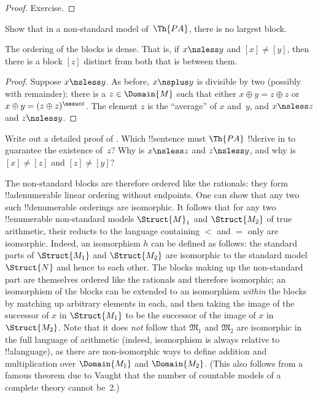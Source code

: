 \documentclass[../../../include/open-logic-section]{subfiles}
\begin{document}
\begin{proof}
Exercise.
\end{proof}

\begin{prob}
Show that in a non-standard model of~$\Th{PA}$, there is no largest
block.
\end{prob}

\begin{prop}
The ordering of the blocks is dense. That is, if $x \nsless y$ and
$[x] \neq [y]$, then there is a block $[z]$ distinct from both that is
between them.
\end{prop}

\begin{proof}
Suppose $x \nsless y$. As before, $x \nsplus y$ is divisible by two
(possibly with remainder): there is a $z \in \Domain{M}$ such that
either $x \oplus y = z \oplus z$ or $x \oplus y = (z \oplus
z)^\nssucc$. The element $z$ is the ``average'' of $x$ and~$y$, and $x
\nsless z$ and $z \nsless y$.
\end{proof}

\begin{prob}
Write out a detailed proof of
. Which !!{sentence} must
$\Th{PA}$ !!{derive} in to guarantee the existence of~$z$? Why is $x
\nsless z$ and $z \nsless y$, and why is $[x] \neq [z]$ and $[z] \neq
        [y]$?
\end{prob}

\begin{explain}
The non-standard blocks are therefore ordered like the rationals: they
form !!a{denumerable} linear ordering without endpoints.  One can show
that any two such !!{denumerable} orderings are isomorphic. It follows
that for any two !!{enumerable} non-standard models $\Struct{M}_1$ and
$\Struct{M_2}$ of true arithmetic, their reducts to the language
containing $<$ and $=$ only are isomorphic. Indeed, an isomorphism $h$
can be defined as follows: the standard parts of $\Struct{M_1}$ and
$\Struct{M_2}$ are isomorphic to the standard model $\Struct{N}$ and
hence to each other. The blocks making up the non-standard part are
themselves ordered like the rationals and therefore isomorphic; an
isomorphism of the blocks can be extended to an isomorphism
\emph{within} the blocks by matching up arbitrary elements in each,
and then taking the image of the successor of $x$ in $\Struct{M_1}$ to
be the successor of the image of $x$ in $\Struct{M_2}$. Note that it
does \emph{not} follow that $\mathfrak{M}_1$ and $\mathfrak{M}_2$ are
isomorphic in the full language of arithmetic (indeed, isomorphism is
always relative to !!a{language}), as there are non-isomorphic ways to
define addition and multiplication over $\Domain{M_1}$ and
$\Domain{M_2}$. (This also follows from a famous theorem due to Vaught
that the number of countable models of a complete theory cannot be~2.)
\end{explain}
\end{document}
